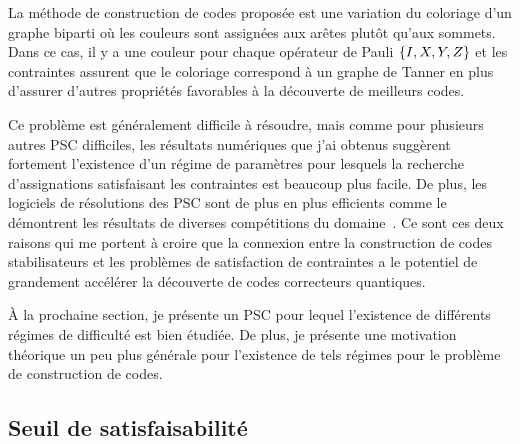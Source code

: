 La méthode de construction de codes proposée est une variation 
du coloriage d'un graphe biparti où les couleurs sont assignées aux arêtes plutôt qu'aux sommets.
Dans ce cas, il y a une couleur pour chaque opérateur de Pauli $\qty{I, X, Y, Z}$
et les contraintes assurent que le coloriage correspond à un graphe de Tanner
en plus d'assurer d'autres propriétés favorables à la découverte de meilleurs codes.

Ce problème est généralement difficile à résoudre,
mais comme pour plusieurs autres PSC difficiles,
les résultats numériques que j'ai obtenus suggèrent fortement
l'existence d'un régime de paramètres pour lesquels la recherche d'assignations
satisfaisant les contraintes est beaucoup plus facile.
De plus,
les logiciels de résolutions des PSC sont de plus en plus efficients comme le démontrent les résultats
de diverses compétitions du domaine~\cite{noauthor_minizinc_nodate, noauthor_sat_nodate}.
Ce sont ces deux raisons qui me portent à croire que la connexion entre la construction de 
codes stabilisateurs et les problèmes de satisfaction de contraintes a le potentiel de grandement accélérer la découverte de codes correcteurs quantiques.

À la prochaine section, 
je présente un PSC pour lequel l'existence de différents régimes de difficulté 
est bien étudiée. 
De plus, je présente une motivation théorique un peu plus générale pour l'existence de
tels régimes pour le problème de construction de codes.

\subsection{Seuil de satisfaisabilité}

